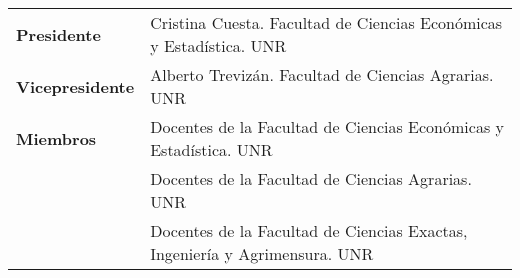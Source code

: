 \documentclass[12pt,a4paper]{article}
\begin{document}
\bigbreak


\begin{table}[h]
\begin{tabular}{p{2.5cm}p{12cm}}
\textbf{Presidente}     & Cristina Cuesta. Facultad de Ciencias Económicas y Estadística. UNR        \\
\textbf{Vicepresidente} & Alberto Trevizán. Facultad de Ciencias Agrarias. UNR                       \\
\textbf{Miembros}       & Docentes de la Facultad de Ciencias Económicas y Estadística. UNR          \\
\textbf{}               & Docentes de la Facultad de Ciencias Agrarias. UNR                          \\
                        & Docentes de la Facultad de Ciencias Exactas, Ingeniería y Agrimensura. UNR
\end{tabular}
\end{table}

\vspace{0.5cm}

{}
\bigbreak
\end{document}

